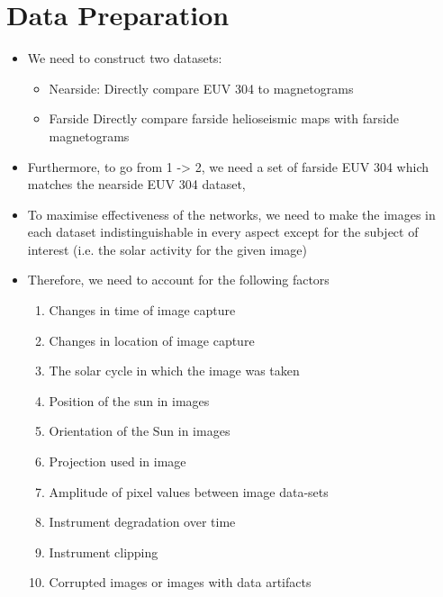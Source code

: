 \documentclass[11pt,a4paper,onecolumn]{report}
\begin{document}


%
%
%
%
\chapter{Data Preparation}
%
%
%
%




\begin{itemize}

  \item We need to construct two datasets:
  
  \begin{itemize}
    \item Nearside: Directly compare EUV 304 to magnetograms
    \item Farside Directly compare farside helioseismic maps with farside magnetograms
  \end{itemize}
  
  \item Furthermore, to go from 1 -> 2,  we need a set of farside EUV 304 which
  matches the nearside EUV 304 dataset,

  \item To maximise effectiveness of the networks, we need to make the images in
  each dataset indistinguishable in every aspect except for the subject of
  interest (i.e. the solar activity for the given image)

  
  \item Therefore, we need to account for the following factors
  
  \begin{enumerate}[i]
    \item Changes in time of image capture
    \item Changes in location of image capture
    \item The solar cycle in which the image was taken
    \item Position of the sun in images
    \item Orientation of the Sun in images
    \item Projection used in image
    \item Amplitude of pixel values between image data-sets
    \item Instrument degradation over time
    \item Instrument clipping
    \item Corrupted images or images with data artifacts
  \end{enumerate}




\end{itemize}
\end{document}
